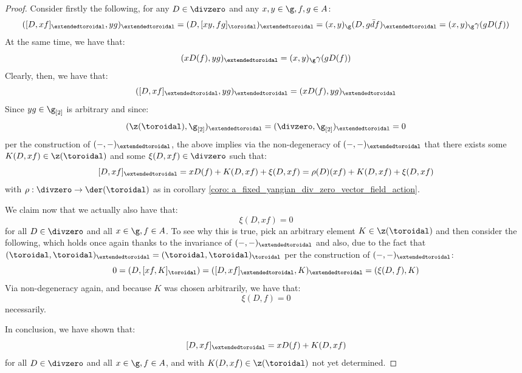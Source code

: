             \begin{proof}
                Consider firstly the following, for any $D \in \divzero$ and any $x, y \in \g, f, g \in A$:
                    $$( [D, xf]_{\extendedtoroidal}, yg )_{\extendedtoroidal} = ( D, [xy, fg]_{\toroidal} )_{\extendedtoroidal} = (x, y)_{\g} ( D, g\bar{d}f )_{\extendedtoroidal} = (x, y)_{\g} \gamma( g D(f) )$$
                At the same time, we have that:
                    $$( x D(f), yg )_{\extendedtoroidal} = (x, y)_{\g} \gamma( g D(f) )$$
                Clearly, then, we have that:
                    $$( [D, xf]_{\extendedtoroidal}, yg )_{\extendedtoroidal} = ( x D(f), yg )_{\extendedtoroidal}$$
                Since $yg \in \g_{[2]}$ is arbitrary and since:
                    $$(\z(\toroidal), \g_{[2]})_{\extendedtoroidal} = (\divzero, \g_{[2]})_{\extendedtoroidal} = 0$$
                per the construction of $(-, -)_{\extendedtoroidal}$, the above implies via the non-degeneracy of $(-, -)_{\extendedtoroidal}$ that there exists some $K(D, xf) \in \z(\toroidal)$ and some $\xi(D, xf) \in \divzero$ such that:
                    $$[D, xf]_{\extendedtoroidal} = x D(f) + K(D, xf) + \xi(D, xf) = \rho(D)(xf) + K(D, xf) + \xi(D, xf)$$
                with $\rho: \divzero \to \der(\toroidal)$ as in corollary \ref{coro: a_fixed_yangian_div_zero_vector_field_action}.

                We claim now that we actually also have that:
                    $$\xi(D, xf) = 0$$
                for all $D \in \divzero$ and all $x \in \g, f \in A$. To see why this is true, pick an arbitrary element $K \in \z(\toroidal)$ and then consider the following, which holds once again thanks to the invariance of $(-, -)_{\extendedtoroidal}$ and also, due to the fact that $(\toroidal, \toroidal)_{\extendedtoroidal} = (\toroidal, \toroidal)_{\toroidal}$ per the construction of $(-, -)_{\extendedtoroidal}$:
                    $$0 = ( D, [xf, K]_{\toroidal} ) = ( [D, xf]_{\extendedtoroidal}, K )_{\extendedtoroidal} = ( \xi(D, f), K )$$
                Via non-degeneracy again, and because $K$ was chosen arbitrarily, we have that:
                    $$\xi(D, f) = 0$$
                necessarily.

                In conclusion, we have shown that:
                    $$[D, xf]_{\extendedtoroidal} = x D(f) + K(D, xf)$$
                for all $D \in \divzero$ and all $x \in \g, f \in A$, and with $K(D, xf) \in \z(\toroidal)$ not yet determined.
            \end{proof}

